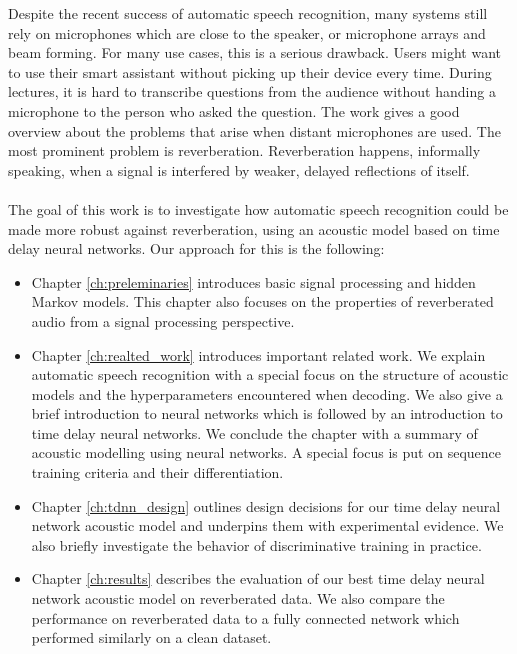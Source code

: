 Despite the recent success of automatic speech recognition, many systems still rely on microphones which are close to the speaker, or microphone arrays and beam forming. For many use cases, this is a serious drawback. Users might want to use their smart assistant without picking up their device every time. During lectures, it is hard to transcribe questions from the audience without handing a microphone to the person who asked the question.
The work \cite{yoshioka2012making} gives a good overview about the problems that arise when distant microphones are used. The most prominent problem is reverberation. Reverberation happens, informally speaking, when a signal is interfered by weaker, delayed reflections of itself. \\ \\
The goal of this work is to investigate how automatic speech recognition could be made more robust against reverberation, using an acoustic model based on time delay neural networks. Our approach for this is the following: 
\begin{itemize}
\item Chapter \ref{ch:preleminaries} introduces basic signal processing and hidden Markov models. This chapter also focuses on the properties of reverberated audio from a signal processing perspective.
\item Chapter \ref{ch:realted_work} introduces important related work. We explain automatic speech recognition with a special focus on the structure of acoustic models and the hyperparameters encountered when decoding. We also give a brief introduction to neural networks which is followed by an introduction to time delay neural networks. We conclude the chapter with a summary of acoustic modelling using neural networks. A special focus is put on sequence training criteria and their differentiation. 
\item Chapter \ref{ch:tdnn_design} outlines design decisions for our time delay neural network acoustic model and underpins them with experimental evidence. We also briefly investigate the behavior of discriminative training in practice. 
\item Chapter \ref{ch:results} describes the evaluation of our best time delay neural network acoustic model on reverberated data. We also compare the performance on reverberated data to a fully connected network which performed similarly on a clean dataset. 
\iffalse
Before we explain the properties of time delay neural networks in depth, we first introduce neural networks in section \ref{sec:neural_networks} as well as the basics of automated speech recognition in section \ref{ch:HMM_ASR}. In chapter \ref{ch:approach} we will explain our solution in detail and then show experimental results in chapter \ref{ch:results}.
\fi
\end{itemize}


